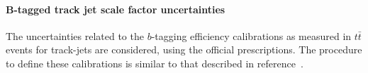 




\paragraph{B-tagged track jet scale factor uncertainties}
\label{sec:b-tagging-unc}

The uncertainties related to the $b$-tagging efficiency calibrations as measured in $t\bar{t}$ events for track-jets are considered, using the official prescriptions. The procedure to define these calibrations is similar to that described in reference~\cite{Aad:2015ydr}.

